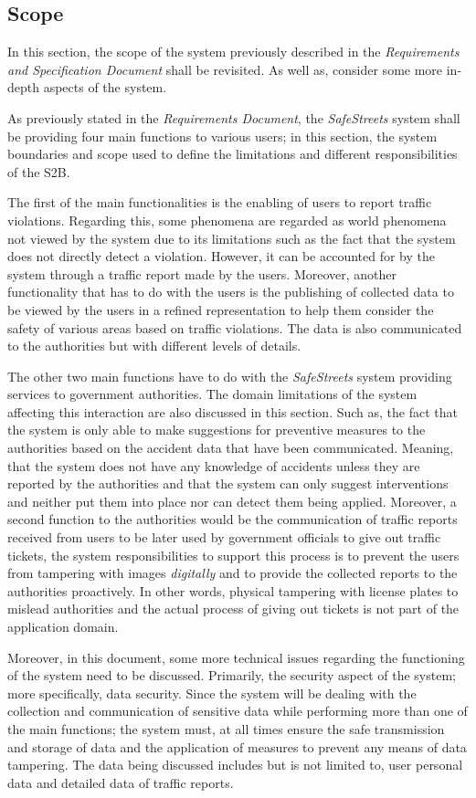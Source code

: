 \subsection{Scope}
In this section, the scope of the system previously described in the \emph{Requirements and Specification Document} shall be revisited. As well as, consider some more in-depth aspects of the system.

As previously stated in the \emph{Requirements Document}, the \emph{SafeStreets} system shall be providing four main functions to various users; in this section, the system boundaries and scope used to define the limitations and different responsibilities of the S2B. 

The first of the main functionalities is the enabling of users to report traffic violations. Regarding this, some phenomena are regarded as world phenomena not viewed by the system due to its limitations such as the fact that the system does not directly detect a violation. However, it can be accounted for by the system through a traffic report made by the users. Moreover, another functionality that has to do with the users is the publishing of collected data to be viewed by the users in a refined representation to help them consider the safety of various areas based on traffic violations. The data is also communicated to the authorities but with different levels of details.

The other two main functions have to do with the \emph{SafeStreets} system providing services to government authorities. The domain limitations of the system affecting this interaction are also discussed in this section. Such as, the fact that the system is only able to make suggestions for preventive measures to the authorities based on the accident data that have been communicated. Meaning, that the system does not have any knowledge of accidents unless they are reported by the authorities and that the system can only suggest interventions and neither put them into place nor can detect them being applied. Moreover, a second function to the authorities would be the communication of traffic reports received from users to be later used by government officials to give out traffic tickets, the system responsibilities to support this process is to prevent the users from tampering with images \emph{digitally} and to provide the collected reports to the authorities proactively. In other words, physical tampering with license plates to mislead authorities and the actual process of giving out tickets is not part of the application domain. 

Moreover, in this document, some more technical issues regarding the functioning of the system need to be discussed. Primarily, the security aspect of the system; more specifically, data security.
Since the system will be dealing with the collection and communication of sensitive data while performing more than one of the main functions; the system must, at all times ensure the safe transmission and storage of data and the application of measures to prevent any means of data tampering. The data being discussed includes but is not limited to, user personal data and detailed data of traffic reports.
